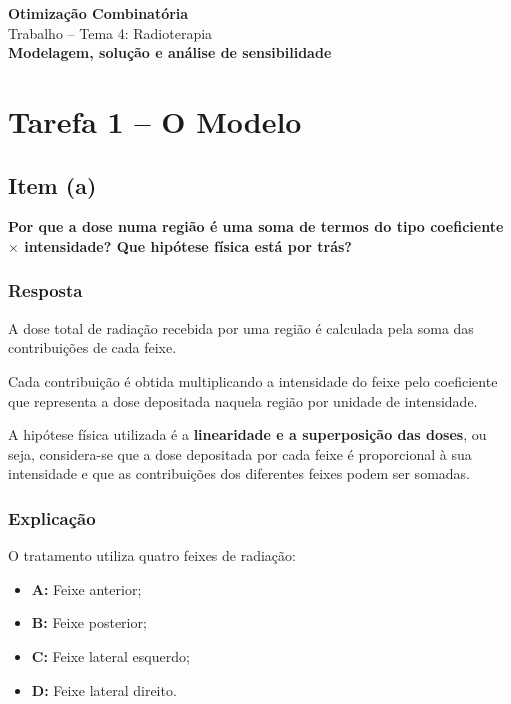 \documentclass[12pt,a4paper]{article}
\begin{document}
\begin{center}
    {\Large \textbf{Otimização Combinatória}}\\[0.3cm]
    {\large Trabalho -- Tema 4: Radioterapia}\\[0.2cm]
    \textbf{Modelagem, solução e análise de sensibilidade}
\end{center}

\vspace{0.5cm}

\section*{Tarefa 1 -- O Modelo}

\subsection*{Item (a)}

\textbf{Por que a dose numa região é uma soma de termos
do tipo coeficiente $\times$ intensidade?
Que hipótese física está por trás?}

\subsubsection*{Resposta}

A dose total de radiação recebida por uma região é
calculada pela soma das contribuições de cada feixe.

Cada contribuição é obtida multiplicando a intensidade
do feixe pelo coeficiente que representa a dose
depositada naquela região por unidade de intensidade.

A hipótese física utilizada é a
\textbf{linearidade e a superposição das doses},
ou seja, considera-se que a dose depositada por cada
feixe é proporcional à sua intensidade e que as
contribuições dos diferentes feixes podem ser somadas.

\subsubsection*{Explicação}

O tratamento utiliza quatro feixes de radiação:

\begin{itemize}
    \item \textbf{A:} Feixe anterior;
    \item \textbf{B:} Feixe posterior;
    \item \textbf{C:} Feixe lateral esquerdo;
    \item \textbf{D:} Feixe lateral direito.
\end{itemize}
\end{document}
